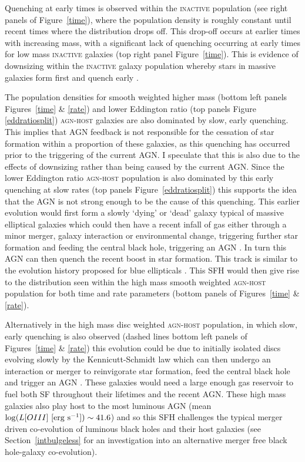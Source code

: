 Quenching at early times is observed within the \textsc{inactive} population (see right panels of Figure~\ref{time}), where the population density is roughly constant until recent times where the distribution drops off.  This drop-off occurs at earlier times with increasing mass, with a significant lack of quenching occurring at early times for low mass \textsc{inactive} galaxies (top right panel Figure~\ref{time}). This is evidence of downsizing within the \textsc{inactive} galaxy population whereby stars in massive galaxies form first and quench early \citep{Cowie96, Thomas10}. 

The population densities for smooth weighted higher mass (bottom left panels Figures~\ref{time} \& \ref{rate}) and lower Eddington ratio (top panels Figure \ref{eddratiosplit}) \textsc{agn-host} galaxies are also dominated by slow, early quenching. This implies that AGN feedback is not responsible for the cessation of star formation within a proportion of these galaxies, as this quenching has occurred prior to the triggering of the current AGN. I speculate that this is also due to the effects of downsizing rather than being caused by the current AGN. Since the lower Eddington ratio \textsc{agn-host} population is also dominated by this early quenching at slow rates (top panels Figure~\ref{eddratiosplit}) this supports the idea that the AGN is not strong enough to be the cause of this quenching.  This earlier evolution would first form a slowly `dying' or `dead' galaxy typical of massive elliptical galaxies which could then have a recent infall of gas either through a minor merger, galaxy interaction or environmental change, triggering further star formation and feeding the central black hole, triggering an AGN \citep{kaviraj14b}. In turn this AGN can then quench the recent boost in star formation. This track is similar to the evolution history proposed for blue ellipticals \citep[][and detected in the top panel of Figure~\ref{blue_c}]{Kaviraj13, McIntosh14, Haines15}. This SFH would then give rise to the distribution seen within the high mass smooth weighted \textsc{agn-host} population for both time and rate parameters (bottom panels of Figures~\ref{time} \& \ref{rate}).

Alternatively in the high mass disc weighted \textsc{agn-host} population, in which slow, early quenching is also observed (dashed lines bottom left panels of Figures~\ref{time} \& \ref{rate}) this evolution could be due to initially isolated discs evolving slowly by the Kennicutt-Schmidt \citep{Schmidt59, Kennicutt97} law which can then undergo an interaction or merger to reinvigorate star formation, feed the central black hole and trigger an AGN \citep{Varela04, emsellem15}. These galaxies would need a large enough gas reservoir to fuel both SF throughout their lifetimes and the recent AGN. These high mass galaxies also play host to the most luminous AGN (mean $\log (L[OIII] ~[\rm{erg}~s^{-1}]) \sim 41.6$) and so this SFH challenges the typical merger driven co-evolution of luminous black holes and their host galaxies (see Section~\ref{intbulgeless} for an investigation into an alternative merger free black hole-galaxy co-evolution). 

